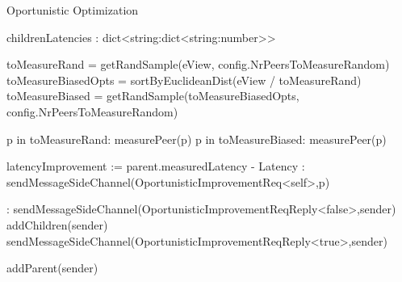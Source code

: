 \begin{algorithm}[H]
\begin{algorithmic}[1]

    \caption{Oportunistic Optimization}

    \asdstate
        \State childrenLatencies : dict<string:dict<string:number>>
    \asdend

        \State toMeasureRand = getRandSample(eView, config.NrPeersToMeasureRandom)
        \State toMeasureBiasedOpts = sortByEuclideanDist(eView / toMeasureRand)
        \State toMeasureBiased = getRandSample(toMeasureBiasedOpts, config.NrPeersToMeasureRandom)

        \For p in toMeasureRand:
            \State measurePeer(p)
        \EndFor
        \For p in toMeasureBiased:
            \State measurePeer(p)
        \EndFor
    \asdend

        \State latencyImprovement := parent.measuredLatency - Latency
        :
            \State sendMessageSideChannel(OportunisticImprovementReq<self>,p)
        \EndIf
    \asdend


        :
            \State sendMessageSideChannel(OportunisticImprovementReqReply<false>,sender)
        \Else
            \State addChildren(sender)
            \State sendMessageSideChannel(OportunisticImprovementReqReply<true>,sender)
        \EndIf
    \asdend

            \State addParent(sender)
        \EndIf
    \asdend

\end{algorithmic}
\end{algorithm}